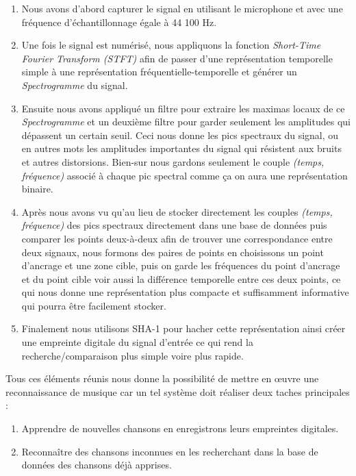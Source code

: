 \documentclass[11pt, report, french]{scrreprt}
\begin{document}
\begin{enumerate}
	\item Nous avons d'abord capturer le signal en utilisant le microphone et avec une fréquence d'échantillonnage égale à 44 100 Hz.
	\item Une fois le signal est numérisé, nous appliquons la fonction \textit{Short-Time Fourier Transform (STFT) } afin de passer d'une représentation temporelle simple à une représentation fréquentielle-temporelle et générer un \textit{Spectrogramme} du signal.
	\item Ensuite nous avons appliqué un filtre pour extraire les maximas locaux de ce \textit{Spectrogramme} et un deuxième filtre pour garder seulement les amplitudes qui dépassent un certain seuil. Ceci nous donne les pics spectraux du signal, ou en autres mots les amplitudes importantes du signal qui résistent aux bruits et autres distorsions. Bien-sur nous gardons seulement le couple \textit{(temps, fréquence)} associé à chaque pic spectral comme ça on aura une représentation binaire. 
	\item Après nous avons vu qu'au lieu de stocker directement les couples \textit{(temps, fréquence)} des pics spectraux directement dans une base de données puis comparer les points deux-à-deux afin de trouver une correspondance entre deux signaux, nous formons des paires de points en choisissons un point d'ancrage et une zone cible, puis on garde les fréquences du point d'ancrage et du point cible voir aussi la différence temporelle entre ces deux points, ce qui nous donne une représentation plus compacte et suffisamment informative qui pourra être facilement stocker.
	\item Finalement nous utilisons SHA-1 pour hacher cette représentation ainsi créer une empreinte digitale du signal d'entrée ce qui rend la recherche/comparaison plus simple voire plus rapide.
\end{enumerate}

\vspace{0.5cm}
Tous ces éléments réunis nous donne la possibilité de mettre en œuvre une reconnaissance de musique car un tel système doit réaliser deux taches principales : \\

\begin{enumerate}
	\item Apprendre de nouvelles chansons en enregistrons leurs empreintes digitales.
	\item Reconnaître des chansons inconnues en les recherchant dans la base de données des chansons déjà apprises.
\end{enumerate}
\end{document}
